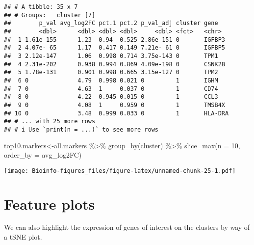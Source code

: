 \documentclass[
  openany]{book}
\newenvironment{Shaded}{\begin{snugshade}}{\end{snugshade}}
\newcommand{\AttributeTok}[1]{\textcolor[rgb]{0.77,0.63,0.00}{#1}}
\newcommand{\DecValTok}[1]{\textcolor[rgb]{0.00,0.00,0.81}{#1}}
\newcommand{\FunctionTok}[1]{\textcolor[rgb]{0.00,0.00,0.00}{#1}}
\newcommand{\NormalTok}[1]{#1}
\newcommand{\OtherTok}[1]{\textcolor[rgb]{0.56,0.35,0.01}{#1}}
\newcommand{\SpecialCharTok}[1]{\textcolor[rgb]{0.00,0.00,0.00}{#1}}
\begin{document}
\begin{verbatim}
## # A tibble: 35 x 7
## # Groups:   cluster [7]
##        p_val avg_log2FC pct.1 pct.2 p_val_adj cluster gene   
##        <dbl>      <dbl> <dbl> <dbl>     <dbl> <fct>   <chr>  
##  1 1.61e-155      1.23  0.94  0.525 2.86e-151 0       IGFBP3 
##  2 4.07e- 65      1.17  0.417 0.149 7.21e- 61 0       IGFBP5 
##  3 2.12e-147      1.06  0.998 0.714 3.75e-143 0       TPM1   
##  4 2.31e-202      0.938 0.994 0.869 4.09e-198 0       CSNK2B 
##  5 1.78e-131      0.901 0.998 0.665 3.15e-127 0       TPM2   
##  6 0              4.79  0.998 0.021 0         1       IGHM   
##  7 0              4.63  1     0.037 0         1       CD74   
##  8 0              4.22  0.945 0.015 0         1       CCL3   
##  9 0              4.08  1     0.959 0         1       TMSB4X 
## 10 0              3.48  0.999 0.033 0         1       HLA-DRA
## # ... with 25 more rows
## # i Use `print(n = ...)` to see more rows
\end{verbatim}

\begin{Shaded}
\begin{Highlighting}[]
\NormalTok{top10.markers}\OtherTok{\textless{}{-}}\NormalTok{all.markers }\SpecialCharTok{\%\textgreater{}\%}
    \FunctionTok{group\_by}\NormalTok{(cluster) }\SpecialCharTok{\%\textgreater{}\%}
    \FunctionTok{slice\_max}\NormalTok{(}\AttributeTok{n =} \DecValTok{10}\NormalTok{, }\AttributeTok{order\_by =}\NormalTok{ avg\_log2FC)}
\end{Highlighting}
\end{Shaded}

\begin{Shaded}
\end{Shaded}

\texttt{[image: Bioinfo-figures\_files/figure-latex/unnamed-chunk-25-1.pdf]}

\clearpage

\hypertarget{feature-plots}{%
\section{Feature plots}\label{feature-plots}}

We can also highlight the expression of genes of interest on the clusters by way of a tSNE plot.
\end{document}
